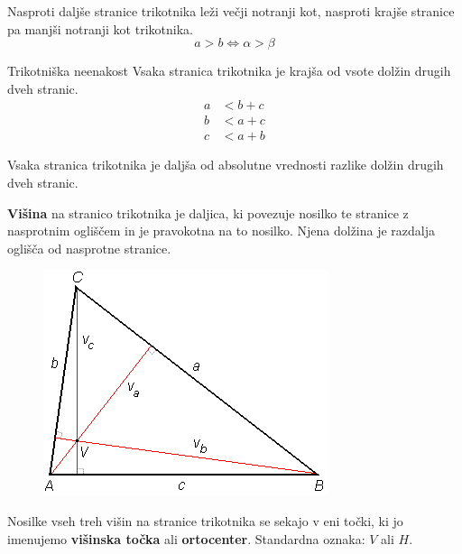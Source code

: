         \begin{frame}
            
            \begin{alertblock}{}
                Nasproti daljše stranice trikotnika leži večji notranji kot, nasproti krajše stranice pa manjši notranji kot trikotnika.
                $$a>b \Leftrightarrow \alpha > \beta$$
            \end{alertblock}

            \begin{alertblock}{Trikotniška neenakost}
                Vsaka stranica trikotnika je krajša od vsote dolžin drugih dveh stranic.
                \begin{align*}
                    a &< b + c \\
                    b &< a + c \\
                    c &< a + b
                \end{align*}
            \end{alertblock}

            \begin{alertblock}{}
                Vsaka stranica trikotnika je daljša od absolutne vrednosti razlike dolžin drugih dveh stranic.
            \end{alertblock}

        \end{frame}


        \begin{frame}

            \begin{alertblock}{}
                \textbf{Višina} na stranico trikotnika je daljica, ki povezuje nosilko te stranice z nasprotnim ogliščem in je pravokotna na to nosilko. 
                Njena dolžina je razdalja oglišča od nasprotne stranice.
            \end{alertblock}

            \begin{figure}
                \includegraphics[scale=0.5]{Slike in skice/Visina_in_visinska_tocka.png}
            \end{figure}

            \begin{alertblock}{}
                Nosilke vseh treh višin na stranice trikotnika se sekajo v eni točki, ki jo imenujemo \textbf{višinska točka} ali \textbf{ortocenter}. Standardna oznaka: $V$ ali $H$.
            \end{alertblock}

        \end{frame}


